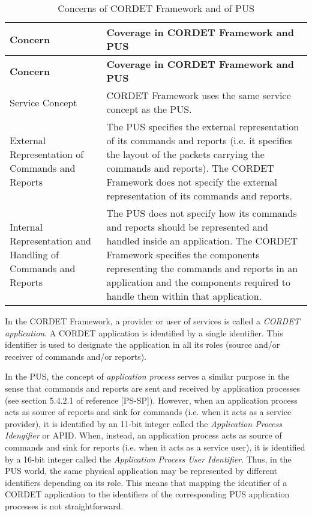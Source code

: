 \begin{longtable}{|>{\raggedright\arraybackslash}p{3cm}|p{10cm}|}
\caption{Concerns of CORDET Framework and of PUS}\label{tab:PusCrConcerns} \\
\hline
\rowcolor{light-gray}
\textbf{Concern} & \textbf{Coverage in CORDET Framework and PUS}\\
\hline\hline
\endfirsthead
\rowcolor{light-gray}
\textbf{Concern} & \textbf{Coverage in CORDET Framework and PUS}\\
\hline\hline
\endhead
Service Concept & CORDET Framework uses the same service concept as the PUS.\\
\hline
External Representation of Commands and Reports & The PUS specifies the external representation of its commands and reports (i.e. it specifies the layout of the packets carrying the commands and reports). The CORDET Framework does not specify the external representation of its commands and reports.\\
\hline
Internal Representation and Handling of Commands and Reports & The PUS does not specify how its commands and reports should be represented and handled inside an application. The CORDET Framework specifies the components representing the commands and reports in an application and the components required to handle them within that application.\\
\hline
\end{longtable}

In the CORDET Framework, a provider or user of services is called a \textit{CORDET application}. A CORDET application is identified by a single identifier. This identifier is used to designate the application in all its roles (source and/or receiver of commands and/or reports). 

In the PUS, the concept of \textit{application process} serves a similar purpose in the sense that commands and reports are sent and received by application processes (see section 5.4.2.1 of reference [PS-SP]). However, when an application process acts as source of reports and sink for commands (i.e. when it acts as a service provider), it is identified by an 11-bit integer called the \textit{Application Process Idengifier} or APID. When, instead, an application process acts as source of commands and sink for reports (i.e. when it acts as a service user), it is identified by a 16-bit integer called the \textit{Application Process User Identifier}. Thus, in the PUS world, the same physical application may be represented by different identifiers depending on its role. This means that mapping the identifier of a CORDET application to the identifiers of the corresponding PUS application processes is not straightforward.  

